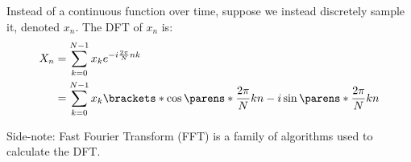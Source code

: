 \newpage
\begin{multicols}{2}

    \begin{CheatsheetEntryFrame}


        Instead of a continuous function over time, suppose we instead discretely sample it, denoted $x_n$. The DFT of $x_n$ is:
        \begin{align*}
            X_n
            &= \sum_{k=0}^{N-1} x_k e^{-i \frac{2 \pi}{N} n k}
            \\
            &= \sum_{k=0}^{N-1} x_k \brackets*{
                \cos\parens*{\frac{2 \pi}{N} k n}
                - i \sin\parens*{\frac{2 \pi}{N} k n}
            }
        \end{align*}

        {\footnotesize
            Side-note: Fast Fourier Transform (FFT) is a family of algorithms used to calculate the DFT.
        }


    \end{CheatsheetEntryFrame}
    
\end{multicols}
\newpage

